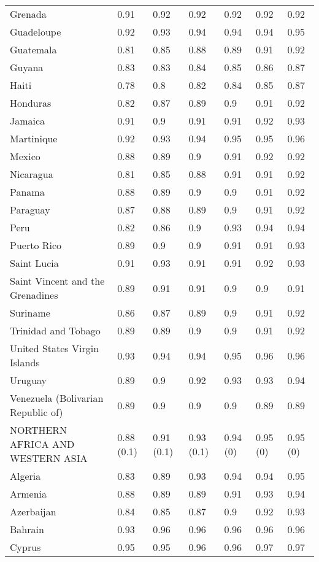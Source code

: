 \begin{longtable}[t]{lllllll}
Grenada & 0.91 & 0.92 & 0.92 & 0.92 & 0.92 & 0.92\\
Guadeloupe & 0.92 & 0.93 & 0.94 & 0.94 & 0.94 & 0.95\\
Guatemala & 0.81 & 0.85 & 0.88 & 0.89 & 0.91 & 0.92\\
Guyana & 0.83 & 0.83 & 0.84 & 0.85 & 0.86 & 0.87\\
Haiti & 0.78 & 0.8 & 0.82 & 0.84 & 0.85 & 0.87\\
Honduras & 0.82 & 0.87 & 0.89 & 0.9 & 0.91 & 0.92\\
Jamaica & 0.91 & 0.9 & 0.91 & 0.91 & 0.92 & 0.93\\
Martinique & 0.92 & 0.93 & 0.94 & 0.95 & 0.95 & 0.96\\
Mexico & 0.88 & 0.89 & 0.9 & 0.91 & 0.92 & 0.92\\
Nicaragua & 0.81 & 0.85 & 0.88 & 0.91 & 0.91 & 0.92\\
Panama & 0.88 & 0.89 & 0.9 & 0.9 & 0.91 & 0.92\\
Paraguay & 0.87 & 0.88 & 0.89 & 0.9 & 0.91 & 0.92\\
Peru & 0.82 & 0.86 & 0.9 & 0.93 & 0.94 & 0.94\\
Puerto Rico & 0.89 & 0.9 & 0.9 & 0.91 & 0.91 & 0.93\\
Saint Lucia & 0.91 & 0.93 & 0.91 & 0.91 & 0.92 & 0.93\\
Saint Vincent and the Grenadines & 0.89 & 0.91 & 0.91 & 0.9 & 0.9 & 0.91\\
Suriname & 0.86 & 0.87 & 0.89 & 0.9 & 0.91 & 0.92\\
Trinidad and Tobago & 0.89 & 0.89 & 0.9 & 0.9 & 0.91 & 0.92\\
United States Virgin Islands & 0.93 & 0.94 & 0.94 & 0.95 & 0.96 & 0.96\\
Uruguay & 0.89 & 0.9 & 0.92 & 0.93 & 0.93 & 0.94\\
Venezuela (Bolivarian Republic of) & 0.89 & 0.9 & 0.9 & 0.9 & 0.89 & 0.89\\
NORTHERN AFRICA AND WESTERN ASIA & 0.88 (0.1) & 0.91 (0.1) & 0.93 (0.1) & 0.94 (0) & 0.95 (0) & 0.95 (0)\\
Algeria & 0.83 & 0.89 & 0.93 & 0.94 & 0.94 & 0.95\\
Armenia & 0.88 & 0.89 & 0.89 & 0.91 & 0.93 & 0.94\\
Azerbaijan & 0.84 & 0.85 & 0.87 & 0.9 & 0.92 & 0.93\\
Bahrain & 0.93 & 0.96 & 0.96 & 0.96 & 0.96 & 0.96\\
Cyprus & 0.95 & 0.95 & 0.96 & 0.96 & 0.97 & 0.97\\

\end{longtable}
